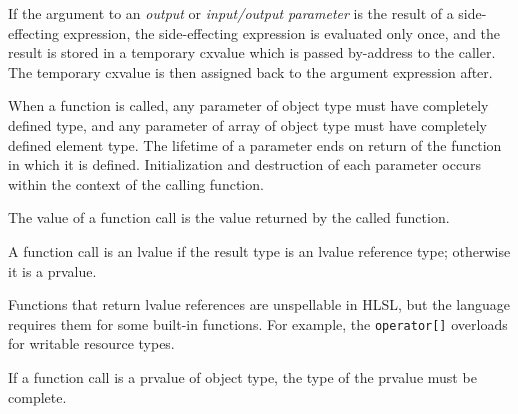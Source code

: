 \begin{note}
  If the argument to an \textit{output} or \textit{input/output parameter} is
  the result of a side-effecting expression, the side-effecting expression is
  evaluated only once, and the result is stored in a temporary cxvalue which is
  passed by-address to the caller. The temporary cxvalue is then assigned back
  to the argument expression after.
\end{note}

\p When a function is called, any parameter of object type must have completely
defined type, and any parameter of array of object type must have completely
defined element type. The lifetime of a parameter ends on return of the function
in which it is defined. Initialization and destruction of each
parameter occurs within the context of the calling function.

\p The value of a function call is the value returned by the called function.

\p A function call is an lvalue if the result type is an lvalue reference type;
otherwise it is a prvalue.

\begin{note}
  Functions that return lvalue references are unspellable in HLSL, but the
  language requires them for some built-in functions. For example, the
  \texttt{operator[]} overloads for writable resource types.
\end{note}

\p If a function call is a prvalue of object type, the type of the prvalue must
be complete.
